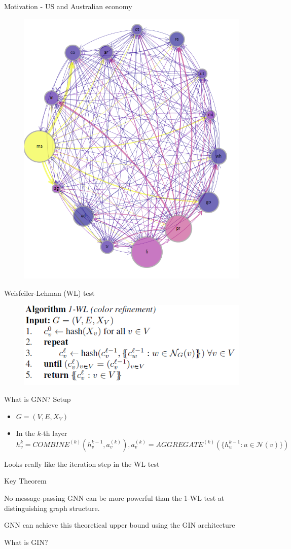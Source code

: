 \documentclass[aspectratio=169]{beamer} %
\begin{document}
\begin{frame}{Motivation - US and Australian economy}
\begin{figure}
    \centering
    \includegraphics[width=0.4\linewidth]{Network/Graph Neural Network/us-net.png}

\end{figure}
    
\end{frame}
\begin{frame}{Weisfeiler-Lehman (WL) test}
\begin{figure}
    \centering
    \includegraphics[width=0.8\linewidth]{Network/Graph Neural Network/Weisfeiler-Lehman.png}
\end{figure}
\end{frame}
\begin{frame}{What is GNN? Setup}
\begin{itemize}
    \item $G = (V,E, X_V)$    
    \item In the $k$-th layer
        $$
    h_v^{k} = COMBINE^{(k)}\left(h_v^{k-1}, a_v^{(k)}\right), a_v^{(k)} = AGGREGATE^{(k)}\left(\{h_u^{k-1}: u\in \mathcal{N}(v)\}\right)
        $$ 
\end{itemize} 
Looks really like the iteration step in the WL test
\end{frame}
\begin{frame}{Key Theorem}
    \begin{theorem}
        No message-passing GNN can be more powerful than the 1-WL test at distinguishing graph structure.
    \end{theorem}
    \begin{theorem}
        GNN can achieve this theoretical upper bound using the GIN architecture
    \end{theorem}
    What is GIN?
\end{frame}
\end{document}
